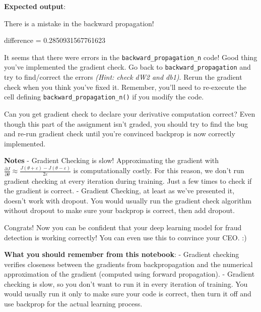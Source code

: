 \documentclass[11pt]{article}
\makeatletter
\newcommand{\boxspacing}{\kern\kvtcb@left@rule\kern\kvtcb@boxsep}
\newcommand{\prompt}[4]{
        \ttfamily\llap{{\color{#2}[#3]:\hspace{3pt}#4}}\vspace{-\baselineskip}
    }
\makeatother
\begin{document}
    \textbf{Expected output}:

There is a mistake in the backward propagation!

difference = 0.2850931567761623

    It seems that there were errors in the \texttt{backward\_propagation\_n}
code! Good thing you've implemented the gradient check. Go back to
\texttt{backward\_propagation} and try to find/correct the errors
\emph{(Hint: check dW2 and db1)}. Rerun the gradient check when you
think you've fixed it. Remember, you'll need to re-execute the cell
defining \texttt{backward\_propagation\_n()} if you modify the code.

Can you get gradient check to declare your derivative computation
correct? Even though this part of the assignment isn't graded, you
should try to find the bug and re-run gradient check until you're
convinced backprop is now correctly implemented.

\textbf{Notes} - Gradient Checking is slow! Approximating the gradient
with
\(\frac{\partial J}{\partial \theta} \approx \frac{J(\theta + \varepsilon) - J(\theta - \varepsilon)}{2 \varepsilon}\)
is computationally costly. For this reason, we don't run gradient
checking at every iteration during training. Just a few times to check
if the gradient is correct. - Gradient Checking, at least as we've
presented it, doesn't work with dropout. You would usually run the
gradient check algorithm without dropout to make sure your backprop is
correct, then add dropout.

Congrats! Now you can be confident that your deep learning model for
fraud detection is working correctly! You can even use this to convince
your CEO. :)

\textbf{What you should remember from this notebook}: - Gradient
checking verifies closeness between the gradients from backpropagation
and the numerical approximation of the gradient (computed using forward
propagation). - Gradient checking is slow, so you don't want to run it
in every iteration of training. You would usually run it only to make
sure your code is correct, then turn it off and use backprop for the
actual learning process.

    \begin{tcolorbox}[breakable, size=fbox, boxrule=1pt, pad at break*=1mm,colback=cellbackground, colframe=cellborder]
\prompt{In}{incolor}{ }{\boxspacing}
\begin{Verbatim}[commandchars=\\\{\}]

\end{Verbatim}
\end{tcolorbox}


    
    
    
\end{document}
